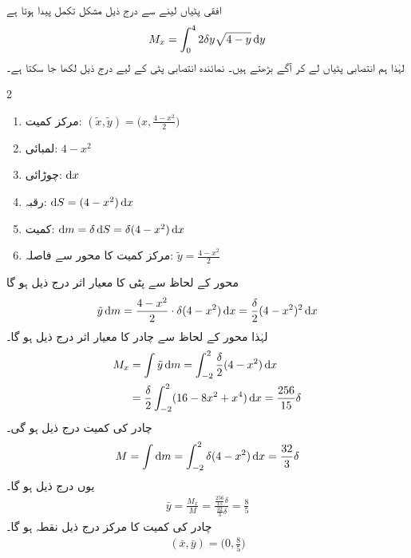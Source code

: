 افقی پٹیاں لینے سے  درج ذیل مشکل تکمل پیدا ہوتا ہے
\begin{align*}
M_x=\int_0^42\delta y\sqrt{4-y}\dif y
\end{align*} 
لہٰذا ہم انتصابی پٹیاں لے کر آگے بڑھتے ہیں۔ نمائندہ انتصابی پٹی کے لیے درج ذیل لکھا جا سکتا ہے۔
\begin{multicols}{2}
\begin{enumerate}[]
\item
مرکز کمیت:\quad
$(\tilde{x},\tilde{y})=\big(x,\frac{4-x^2}{2}\big)$
\item
لمبائی:\quad
$4-x^2$
\item
چوڑائی:\quad
$\dif x$
\item
رقبہ:\quad
$\dif S=(4-x^2)\dif x$
\item
کمیت:\quad
$\dif m=\delta \dif S=\delta(4-x^2)\dif x$
\item
مرکز کمیت کا محور  سے فاصلہ:\quad
$\tilde{y}=\frac{4-x^2}{2}$
\end{enumerate}
\end{multicols}
محور  کے لحاظ سے پٹی کا معیار اثر درج ذیل ہو گا
\begin{align*}
\tilde{y}\dif m=\frac{4-x^2}{2}\cdot \delta(4-x^2)\dif x=\frac{\delta}{2}(4-x^2)^2\dif x
\end{align*}
لہٰذا محور  کے لحاظ سے چادر کا معیار اثر درج ذیل ہو گا۔
\begin{align}\label{مساوات_تکمل_استعمال_محور_ایکس_لحاظ_معیار_اثر}
M_x&=\int \tilde{y}\dif m=\int_{-2}^2\frac{\delta}{2}(4-x^2)\dif x\\
&=\frac{\delta}{2}\int_{-2}^2(16-8x^2+x^4)\dif x=\frac{256}{15}\delta
\end{align}
چادر کی کمیت درج ذیل ہو گی۔
\begin{align}\label{مساوات_تکمل_استعمال_محور_کمیت_چادر}
M=\int \dif m=\int_{-2}^2\delta(4-x^2)\dif x=\frac{32}{3}\delta
\end{align}
یوں درج ذیل ہو گا۔
\begin{align*}
\bar{y}=\frac{M_x}{M}=\frac{\frac{256}{15}\delta}{\frac{32}{3}\delta}=\frac{8}{5}
\end{align*}
چادر کی کمیت کا مرکز درج ذیل نقطہ ہو گا۔
\begin{align*}
(\bar{x},\bar{y})=\big(0,\frac{8}{5}\big)
\end{align*}
